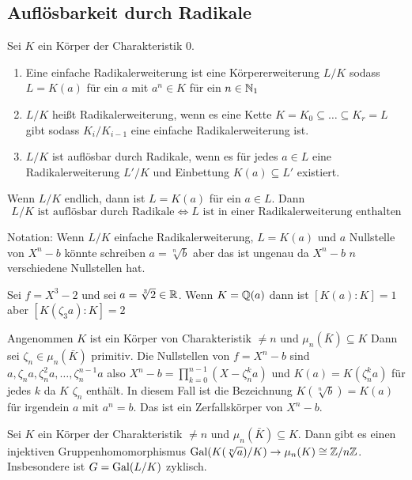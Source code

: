 \subsection{Auflösbarkeit durch Radikale}
\begin{Def}
    Sei \(K\) ein Körper der Charakteristik 0.
    \begin{enumerate}
        \item Eine einfache Radikalerweiterung ist eine Körpererweiterung \(L/K\) sodass \(L=K(a)\) für ein \(a\) mit \(a^n\in K\) für ein \(n\in\mathbb{N}_1\)
        \item \(L/K\) heißt Radikalerweiterung, wenn es eine Kette \(K=K_0\subseteq\dots \subseteq K_r=L\) gibt sodass \(K_i/K_{i-1}\) eine einfache Radikalerweiterung ist.
        \item \(L/K\) ist auflösbar durch Radikale, wenn es für jedes \(a\in L\) eine Radikalerweiterung \(L'/K\) und Einbettung \(K(a)\subseteq L'\) existiert.
    \end{enumerate}
\end{Def}
\begin{Bem}
    Wenn \(L/K\) endlich, dann ist \(L=K(a)\) für ein \(a\in L\).
    Dann
    \[L/K \text{ ist auflösbar durch Radikale}\iff L\text{ ist in einer Radikalerweiterung enthalten}\]
\end{Bem}
\begin{Bem}
    Notation: Wenn \(L/K\) einfache Radikalerweiterung, \(L=K(a)\) und \(a\) Nullstelle von \(X^n-b\) könnte schreiben \(a=\sqrt[n]{b}\) aber das ist ungenau da \(X^n-b\) \(n\) verschiedene Nullstellen hat.
\end{Bem}
\begin{Bsp}
    Sei \(f=X^3-2\) und sei \(a=\sqrt[3]{2}\in\mathbb{R}\). Wenn \(K=\mathbb{Q}(a)\) dann ist \([K(a):K]=1\) aber \([K(\zeta_3 a):K]=2\)
\end{Bsp}
\begin{Bem}
    Angenommen \(K\) ist ein Körper von Charakteristik \(\neq n\) und \(\mu_n(\bar K)\subseteq K\) Dann sei \(\zeta_n\in\mu_n(\bar K)\) primitiv.
    Die Nullstellen von \(f=X^n-b\) sind \(a,\zeta_na,\zeta_n^2a,\dots,\zeta_n^{n-1}a\) also 
    \(X^n-b=\prod\limits_{k=0}^{n-1}(X-\zeta_n^ka)\) und \(K(a)=K(\zeta_n^ka)\) für jedes \(k\) da \(K\) \(\zeta_n\) enthält. In diesem Fall ist die Bezeichnung \(K(\sqrt[n]{b})=K(a)\) für irgendein \(a\) mit \(a^n=b\). Das ist ein Zerfallskörper von \(X^n-b\).
\end{Bem}
\begin{Lemma}\label{Lem:EinfRadZykl}
    Sei \(K\) ein Körper der Charakteristik \(\neq n\) und \(\mu_n(\bar K)\subseteq K\). Dann gibt es einen injektiven Gruppenhomomorphismus \(\operatorname{Gal}(K(\sqrt[n]{a})/K)\to \mu_n(K)\cong \mathbb{Z}/n\mathbb{Z}\). Insbesondere ist \(G=\operatorname{Gal}(L/K)\) zyklisch.
\end{Lemma}
